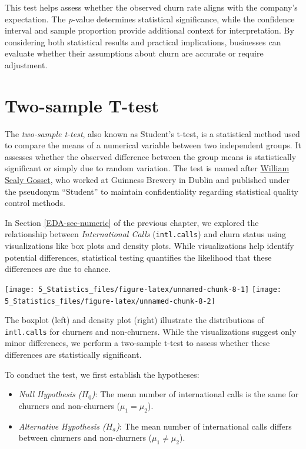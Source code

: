 \documentclass[
  11pt,
]{book}
\newcommand{\passthrough}[1]{#1}
\providecommand{\tightlist}{%
  \setlength{\itemsep}{0pt}\setlength{\parskip}{0pt}}
\theoremstyle{definition}
\theoremstyle{definition}
\theoremstyle{definition}
\theoremstyle{definition}
\theoremstyle{remark}
\begin{document}
This test helps assess whether the observed churn rate aligns with the company's expectation. The \emph{p}-value determines statistical significance, while the confidence interval and sample proportion provide additional context for interpretation. By considering both statistical results and practical implications, businesses can evaluate whether their assumptions about churn are accurate or require adjustment.

\section{Two-sample T-test}\label{two-sample-t-test}

The \emph{two-sample t-test}, also known as Student's t-test, is a statistical method used to compare the means of a numerical variable between two independent groups. It assesses whether the observed difference between the group means is statistically significant or simply due to random variation. The test is named after \href{https://en.wikipedia.org/wiki/William_Sealy_Gosset}{William Sealy Gosset}, who worked at Guinness Brewery in Dublin and published under the pseudonym ``Student'' to maintain confidentiality regarding statistical quality control methods.

In Section \ref{EDA-sec-numeric} of the previous chapter, we explored the relationship between \emph{International Calls} (\passthrough{\lstinline!intl.calls!}) and churn status using visualizations like box plots and density plots. While visualizations help identify potential differences, statistical testing quantifies the likelihood that these differences are due to chance.

\texttt{[image: 5\_Statistics\_files/figure-latex/unnamed-chunk-8-1]} \texttt{[image: 5\_Statistics\_files/figure-latex/unnamed-chunk-8-2]}

The boxplot (left) and density plot (right) illustrate the distributions of \passthrough{\lstinline!intl.calls!} for churners and non-churners. While the visualizations suggest only minor differences, we perform a two-sample t-test to assess whether these differences are statistically significant.

To conduct the test, we first establish the hypotheses:

\begin{itemize}
\tightlist
\item
  \emph{Null Hypothesis (\(H_0\))}: The mean number of international calls is the same for churners and non-churners (\(\mu_1 = \mu_2\)).
\item
  \emph{Alternative Hypothesis (\(H_a\))}: The mean number of international calls differs between churners and non-churners (\(\mu_1 \neq \mu_2\)).
\end{itemize}
\end{document}
